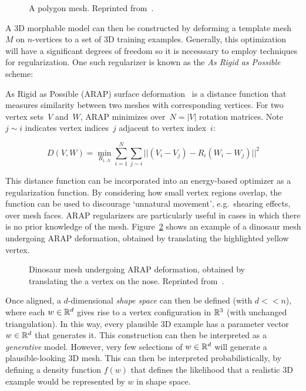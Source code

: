 \begin{figure}[t] %
    \caption{A polygon mesh. Reprinted from~\cite{polygon_mesh}.}
    \label{fig:polygon_mesh}
\end{figure}

A 3D morphable model can then be constructed by deforming a template mesh $M$ on $n$-vertices to a set of 3D training examples. Generally, this optimization will have a significant degrees of freedom so it is necesssary to employ techniques for regularization. One such regularizer is known as the \emph{As Rigid as Possible} scheme: 

\begin{definition}
As Rigid as Possible (ARAP) surface deformation~\cite{sorkine2007rigid} is a distance function that measures similarity between two meshes with corresponding vertices. For two vertex sets~$V$ and~$W$, ARAP minimizes over~$N = |V|$ rotation matrices. Note~$j \sim i$ indicates vertex indices~$j$ adjacent to vertex index~$i$:

\begin{equation}
    D(V, W) = \min_{R_{1..N}}\sum_{i=1}^{N}\sum_{j \sim i}|| (V_{i} - V_{j}) - R_{i}(W_{i} - W_{j}) ||^{2}
\end{equation}

This distance function can be incorporated into an energy-based optimizer as a regularization function. By considering how small vertex regions overlap, the function can be used to  discourage `unnatural movement', e.g.\ shearing effects, over mesh faces. ARAP regularizers are particularly useful in cases in which there is no prior knowledge of the mesh. Figure~\ref{fig:arap_dino} shows an example of a dinosaur mesh undergoing ARAP deformation, obtained by translating the highlighted yellow vertex.

\begin{figure}[t] %
    \caption{Dinosaur mesh undergoing ARAP deformation, obtained by translating the a vertex on the nose. Reprinted from~\cite{sorkine2007rigid}.}
    \label{fig:arap_dino}
\end{figure}      

\end{definition}

Once aligned, a $d$-dimensional \emph{shape space} can then be defined (with $d << n$), where each $w \in {\mathbb{R}^{d}}$ gives rise to a vertex configuration in ${\mathbb{R}^{3}}$ (with unchanged triangulation). In this way, every plausible 3D example has a parameter vector $w \in {\mathbb{R}^{d}}$ that generates it. This construction can then be interpreted as a \emph{generative} model. However, very few selections of $w \in {\mathbb{R}^{d}}$ will generate a plausible-looking 3D mesh. This can then be interpreted probabilistically, by defining a density function $f(w)$ that defines the likelihood that a realistic 3D example would be represented by $w$ in shape space. 

